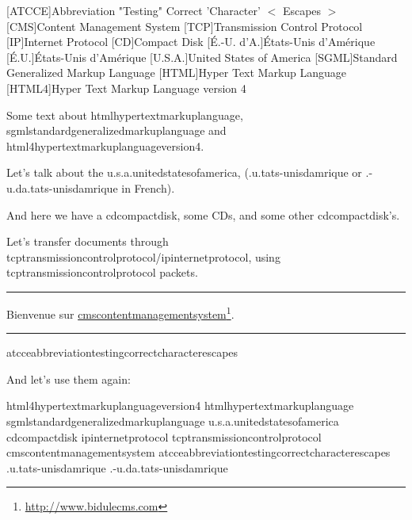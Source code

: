 
\def\mytitle{Abbreviations}

[ATCCE]{Abbreviation "Testing" Correct 'Character' $<$ Escapes $>$}
[CMS]{Content Management System}
[TCP]{Transmission Control Protocol}
[IP]{Internet Protocol}
[CD]{Compact Disk}
[É.-{}U. d'A.]{États-{}Unis d'Amérique}
[É.U.]{États-{}Unis d'Amérique}
[U.S.A.]{United States of America}
[SGML]{Standard Generalized Markup Language}
[HTML]{Hyper Text Markup Language}
[HTML4]{Hyper Text Markup Language version 4}

Some text about \ac{htmlhypertextmarkuplanguage}, \ac{sgmlstandardgeneralizedmarkuplanguage} and \ac{html4hypertextmarkuplanguageversion4}.

Let's talk about the \ac{u.s.a.unitedstatesofamerica}, (\ac{.u.tats-unisdamrique} or \ac{.-u.da.tats-unisdamrique} in French).

And here we have a \ac{cdcompactdisk}, some CDs, and some other \ac{cdcompactdisk}'s.

Let's transfer documents through \ac{tcptransmissioncontrolprotocol}\slash \ac{ipinternetprotocol}, using \ac{tcptransmissioncontrolprotocol} packets.

\begin{center}\rule{3in}{0.4pt}\end{center}


Bienvenue sur \href{http://www.bidulecms.com}{\ac{cmscontentmanagementsystem}}\footnote{\href{http://www.bidulecms.com}{http:/\slash www.bidulecms.com}}.

\begin{center}\rule{3in}{0.4pt}\end{center}


\ac{atcceabbreviationtestingcorrectcharacterescapes}

And let's use them again:

\ac{html4hypertextmarkuplanguageversion4}
\ac{htmlhypertextmarkuplanguage}
\ac{sgmlstandardgeneralizedmarkuplanguage}
\ac{u.s.a.unitedstatesofamerica}
\ac{cdcompactdisk}
\ac{ipinternetprotocol}
\ac{tcptransmissioncontrolprotocol}
\ac{cmscontentmanagementsystem}
\ac{atcceabbreviationtestingcorrectcharacterescapes}
\ac{.u.tats-unisdamrique}
\ac{.-u.da.tats-unisdamrique}




